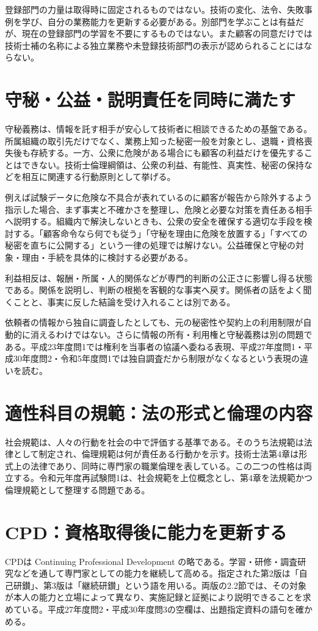 登録部門の力量は取得時に固定されるものではない。技術の変化、法令、失敗事例を学び、自分の業務能力を更新する必要がある。別部門を学ぶことは有益だが、現在の登録部門の学習を不要にするものではない。また顧客の同意だけでは技術士補の名称による独立業務や未登録技術部門の表示が認められることにはならない。

\section{守秘・公益・説明責任を同時に満たす}
\label{theory:engineer_act:public}
守秘義務は、情報を託す相手が安心して技術者に相談できるための基盤である。所属組織の取引先だけでなく、業務上知った秘密一般を対象とし、退職・資格喪失後も存続する。一方、公衆に危険がある場合にも顧客の利益だけを優先することはできない。技術士倫理綱領は、公衆の利益、有能性、真実性、秘密の保持などを相互に関連する行動原則として挙げる\cite{cpd_v3}。

例えば試験データに危険な不具合が表れているのに顧客が報告から除外するよう指示した場合、まず事実と不確かさを整理し、危険と必要な対策を責任ある相手へ説明する。組織内で解決しないときも、公衆の安全を確保する適切な手段を検討する。「顧客命令なら何でも従う」「守秘を理由に危険を放置する」「すべての秘密を直ちに公開する」という一律の処理では解けない。公益確保と守秘の対象・理由・手続を具体的に検討する必要がある。

利益相反は、報酬・所属・人的関係などが専門的判断の公正さに影響し得る状態である。関係を説明し、判断の根拠を客観的な事実へ戻す。関係者の話をよく聞くことと、事実に反した結論を受け入れることは別である。

依頼者の情報から独自に調査したとしても、元の秘密性や契約上の利用制限が自動的に消えるわけではない。さらに情報の所有・利用権と守秘義務は別の問題である。平成23年度問1では権利を当事者の協議へ委ねる表現、平成27年度問1・平成30年度問2・令和5年度問1では独自調査だから制限がなくなるという表現の違いを読む。

\section{適性科目の規範：法の形式と倫理の内容}
\label{theory:engineer_act:norms}
社会規範は、人々の行動を社会の中で評価する基準である。そのうち法規範は法律として制定され、倫理規範は何が責任ある行動かを示す。技術士法第4章は形式上の法律であり、同時に専門家の職業倫理を表している。この二つの性格は両立する。令和元年度再試験問1は、社会規範を上位概念とし、第4章を法規範かつ倫理規範として整理する問題である。

\section{CPD：資格取得後に能力を更新する}
\label{theory:engineer_act:cpd}
CPDは Continuing Professional Development の略である。学習・研修・調査研究などを通して専門家としての能力を継続して高める。指定された第2版は「自己研鑚」、第3版は「継続研鑚」という語を用いる。両版の2.2節では、その対象が本人の能力と立場によって異なり、実施記録と証拠により説明できることを求めている\cite{cpd_v2,cpd_v3}。平成27年度問2・平成30年度問3の空欄は、出題指定資料の語句を確かめる。

